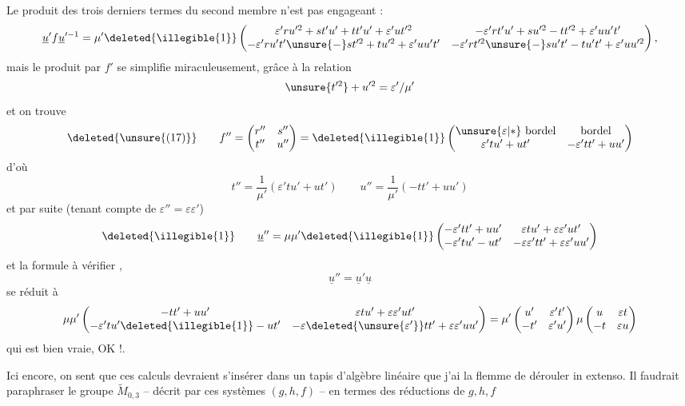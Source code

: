 Le produit des trois derniers termes du second membre n'est pas engageant :
\[
\underline{u}'f\underline{u}'^{-1}
=\mu'\deleted{\illegible{1}}
\begin{pmatrix}
\varepsilon'ru'^2+st'u'+tt'u'+\varepsilon'ut'^2
&-\varepsilon'rt'u'+su'^2-tt'^2+\varepsilon'uu't'\\
-\varepsilon'ru't'\unsure{-}st'^2+tu'^2+\varepsilon'uu't'
&-\varepsilon'rt'^2\unsure{-}su't'-tu't'+\varepsilon'uu'^2
\end{pmatrix},
\]
mais le produit par $f'$ se simplifie miraculeusement, grâce à la relation
\[
\unsure{t'^2}+u'^2=\varepsilon'/\mu'
\]
et on trouve
\[
\deleted{\unsure{(17)}}\qquad
f''=\begin{pmatrix}r''&s''\\t''&u''\end{pmatrix}
=\deleted{\illegible{1}}
\begin{pmatrix}
\unsure{\varepsilon|*}\ \text{bordel}&\text{bordel}\\
\varepsilon'tu'+ut'&-\varepsilon'tt'+uu'
\end{pmatrix}
\]
d'où
\[
\tag{18}
t''=\frac{1}{\mu'}(\varepsilon'tu'+ut')
\qquad
u''=\frac{1}{\mu'}(-tt'+uu')
\]
et par suite (tenant compte de  $\varepsilon''=\varepsilon\varepsilon'$)
\[
\deleted{\illegible{1}}\qquad
\underline{u}''=\mu\mu'\deleted{\illegible{1}}
\begin{pmatrix}
-\varepsilon'tt'+uu'&\varepsilon tu'+\varepsilon\varepsilon'ut'\\
-\varepsilon'tu'-ut'&-\varepsilon\varepsilon'tt'+\varepsilon\varepsilon'uu'
\end{pmatrix}
\]
et la formule à vérifier ,
\[
\underline{u}''=\underline{u}'\underline{u}
\]
se réduit à
\[
\mu\mu'\begin{pmatrix}
-tt'+uu'&\varepsilon tu'+\varepsilon\varepsilon'ut'\\
-\varepsilon'tu'\deleted{\illegible{1}}-ut'&-\varepsilon\deleted{\unsure{\varepsilon'}}tt'+\varepsilon\varepsilon'uu'
\end{pmatrix}
=\mu'\begin{pmatrix}u'&\varepsilon't'\\-t'&\varepsilon'u'\end{pmatrix}
\mu\begin{pmatrix}u&\varepsilon t\\-t&\varepsilon u\end{pmatrix}
\]
qui est bien vraie, OK !.

Ici encore, on sent que ces calculs devraient s'insérer dans un tapis d'algèbre linéaire que j'ai la flemme de dérouler in extenso. Il faudrait paraphraser le groupe  $\widetilde{M}_{0,3}$ -- décrit par ces systèmes $(g,h,f)$ -- en termes  des réductions de $g,h,f$

